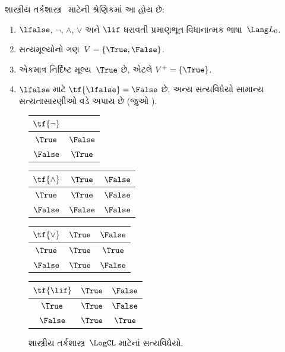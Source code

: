 \begin{ex}
શાસ્ત્રીય તર્કશાસ્ત્ર~\LogCL{} માટેની શ્રેણિકમાં આ હોય છે:
\begin{enumerate}
  \item $\lfalse$, $\lnot$, $\land$, $\lor$ અને $\lif$
  ધરાવતી પ્રમાણભૂત વિધાનાત્મક ભાષા~$\Lang L_0$.
  \item સત્યમૂલ્યોનો ગણ~$V = \{\True, \False\}$.
  \item એકમાત્ર નિર્દિષ્ટ મૂલ્ય~$\True$ છે, એટલે
  $V^+ = \{\True\}$.
  \item $\lfalse$ માટે $\tf{\lfalse} = \False$ છે.
  અન્ય સત્યવિધેયો સામાન્ય સત્યતાસારણીઓ વડે
  અપાય છે (જુઓ ).
\end{enumerate}
\begin{figure}
  \begin{center}
      \begin{tabular}{c|c}
        $\tf{\lnot}$ & \\
        \hline
        $\True$ & $\False$ \\
        $\False$ & $\True$
      \end{tabular}
      \quad
      \begin{tabular}{c|cc}
        $\tf{\land}$ & $\True$ & $\False$ \\
        \hline
        $\True$ & $\True$ & $\False$ \\
        $\False$ & $\False$ & $\False$
      \end{tabular}
      \quad
      \begin{tabular}{c|cc}
        $\tf{\lor}$ & $\True$ & $\False$ \\
        \hline
        $\True$ & $\True$ & $\True$ \\
        $\False$ & $\True$ & $\False$
      \end{tabular}
      \quad
      \begin{tabular}{c|cc}
        $\tf{\lif}$ & $\True$ & $\False$ \\
        \hline
        $\True$ & $\True$ & $\False$ \\
        $\False$ & $\True$ & $\True$
      \end{tabular}
    \end{center}
    \caption{શાસ્ત્રીય તર્કશાસ્ત્ર~$\LogCL$ માટેનાં સત્યવિધેયો.}
  \end{figure}
  \end{ex}
\endgroup


\begingroup
\makeatletter{}\makeatother

